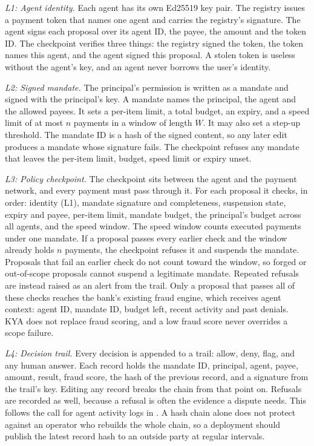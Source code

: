 \documentclass[conference]{IEEEtran}
\begin{document}
\emph{L1: Agent identity.} Each agent has its own Ed25519 key pair. The registry issues a payment token that names one agent and carries the registry's signature. The agent signs each proposal over its agent ID, the payee, the amount and the token ID. The checkpoint verifies three things: the registry signed the token, the token names this agent, and the agent signed this proposal. A stolen token is useless without the agent's key, and an agent never borrows the user's identity.

\emph{L2: Signed mandate.} The principal's permission is written as a mandate and signed with the principal's key. A mandate names the principal, the agent and the allowed payees. It sets a per-item limit, a total budget, an expiry, and a speed limit of at most $n$ payments in a window of length $W$. It may also set a step-up threshold. The mandate ID is a hash of the signed content, so any later edit produces a mandate whose signature fails. The checkpoint refuses any mandate that leaves the per-item limit, budget, speed limit or expiry unset.

\emph{L3: Policy checkpoint.} The checkpoint sits between the agent and the payment network, and every payment must pass through it. For each proposal it checks, in order: identity (L1), mandate signature and completeness, suspension state, expiry and payee, per-item limit, mandate budget, the principal's budget across all agents, and the speed window. The speed window counts executed payments under one mandate. If a proposal passes every earlier check and the window already holds $n$ payments, the checkpoint refuses it and suspends the mandate. Proposals that fail an earlier check do not count toward the window, so forged or out-of-scope proposals cannot suspend a legitimate mandate. Repeated refusals are instead raised as an alert from the trail. Only a proposal that passes all of these checks reaches the bank's existing fraud engine, which receives agent context: agent ID, mandate ID, budget left, recent activity and past denials. KYA does not replace fraud scoring, and a low fraud score never overrides a scope failure.

\emph{L4: Decision trail.} Every decision is appended to a trail: allow, deny, flag, and any human answer. Each record holds the mandate ID, principal, agent, payee, amount, result, fraud score, the hash of the previous record, and a signature from the trail's key. Editing any record breaks the chain from that point on. Refusals are recorded as well, because a refusal is often the evidence a dispute needs. This follows the call for agent activity logs in \cite{b28}. A hash chain alone does not protect against an operator who rebuilds the whole chain, so a deployment should publish the latest record hash to an outside party at regular intervals.
\end{document}
